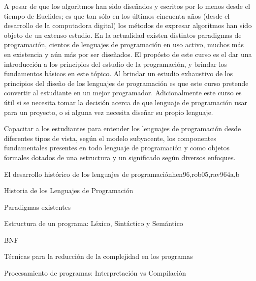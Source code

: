 \begin{syllabus}


\begin{justification}
A pesar de que los algoritmos han sido diseñados y escritos por lo menos
desde el tiempo de Euclides; es que tan sólo en los últimos cincuenta años
(desde el desarrollo de la computadora digital) los métodos de expresar
algoritmos han sido objeto de un extenso estudio. En la actualidad existen
distintos paradigmas de programación, cientos de lenguajes de programación
en uso activo, muchos más en existencia y aún más por ser diseñados.
El propósto de este curso es el dar una introducción a los principios del
estudio de la programación, y brindar los fundamentos básicos en este
tópico. Al brindar un estudio exhaustivo de los principios del diseño de los
lenguajes de programación es que este curso pretende convertir al estudiante
en un mejor programador. Adicionalmente este curso es útil si se necesita
tomar la decisión acerca de que lenguaje de programación usar para un
proyecto, o si alguna vez necesita diseñar su propio lenguaje.
\end{justification}

\begin{goals}
\item Capacitar a los estudiantes para entender los lenguajes de programación desde 
diferentes tipos de vista, según el modelo subyacente, los componentes fundamentales 
presentes en todo lenguaje de programación y como objetos formales dotados de una 
estructura y un significado según diversos enfoques.
\end{goals}

\begin{outcomes}
\end{outcomes}

\begin{unit}{El desarrollo histórico de los lenguajes de programación}{hen96,rob05,rav96}{4}{a,b}
\begin{topics}
      \item Historia de los Lenguajes de Programación
      \item Paradigmas existentes
      \item Estructura de un programa: Léxico, Sintáctico y Semántico
      \item BNF
      \item Técnicas para la reducción de la complejidad en los programas
      \item Procesamiento de programas: Interpretación vs Compilación
   \end{topics}


\end{unit}
\end{syllabus}
